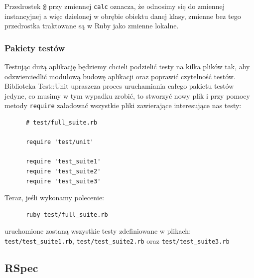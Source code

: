     Przedrostek \verb+@+ przy zmiennej \verb+calc+ oznacza, że odnosimy się do zmiennej instancyjnej a więc dzielonej w obrębie obiektu danej klasy, zmienne bez tego przedrostka traktowane są w Ruby jako zmienne lokalne.
    
    \subsubsection{Pakiety testów}
    Testując dużą aplikację będziemy chcieli podzielić testy na kilka plików tak, aby odzwierciedlić modułową budowę aplikacji oraz poprawić czytelność testów. Biblioteka Test::Unit upraszcza proces uruchamiania całego pakietu testów jedyne, co musimy w tym wypadku zrobić, to stworzyć nowy plik i przy pomocy metody \verb+require+ załadować wszystkie pliki zawierające interesujące nas testy:
    
    \begin{verbatim}
      # test/full_suite.rb
      
      require 'test/unit'
      
      require 'test_suite1'
      require 'test_suite2'
      require 'test_suite3'
    \end{verbatim}
    
    Teraz, jeśli wykonamy polecenie:
    
    \begin{verbatim}
      ruby test/full_suite.rb
    \end{verbatim}
    
    uruchomione zostaną wszystkie testy zdefiniowane w plikach: \verb+test/test_suite1.rb+, \verb+test/test_suite2.rb+ oraz \verb+test/test_suite3.rb+
    \subsection{RSpec}

